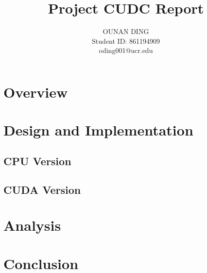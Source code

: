 \documentclass[a4paper,12pt]{article}
\title{Project CUDC Report}
\date{}
\author{
OUNAN DING\\
Student ID: 861194909\\
oding001@ucr.edu
}
\begin{document}
\maketitle{}

\tableofcontents{}

\section{Overview}

\section{Design and Implementation}

\subsection{CPU Version}

\subsection{CUDA Version}

\section{Analysis}

\section{Conclusion}
\end{document}
